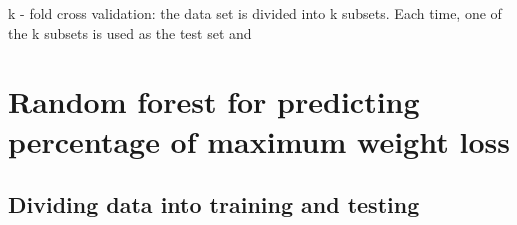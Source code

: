 \documentclass[
]{article}
\begin{document}
k - fold cross validation: the data set is divided into k subsets. Each
time, one of the k subsets is used as the test set and

\hypertarget{random-forest-for-predicting-percentage-of-maximum-weight-loss}{%
\section{Random forest for predicting percentage of maximum weight
loss}\label{random-forest-for-predicting-percentage-of-maximum-weight-loss}}

\hypertarget{dividing-data-into-training-and-testing}{%
\subsection{Dividing data into training and
testing}\label{dividing-data-into-training-and-testing}}
\end{document}
